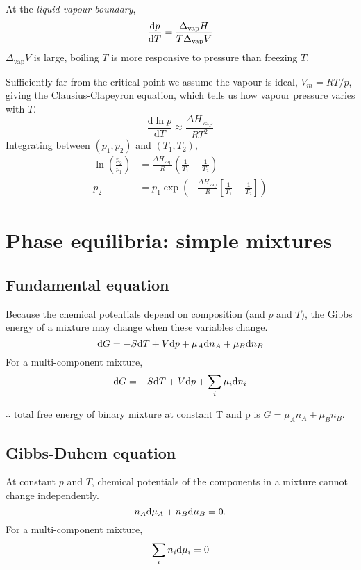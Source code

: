 At the \textit{liquid-vapour boundary},
\begin{equation*}
    \dv{p}{T} = \frac{\Delta_{\textrm{vap}}H}{T\Delta_{\textrm{vap}}V}
\end{equation*}
$\Delta_{\textrm{vap}}V$ is large, boiling $T$ is more responsive to pressure than freezing $T$.

Sufficiently far from the critical point we assume the vapour is ideal, $V_m = RT / p$, giving the Clausius-Clapeyron equation, which tells us how vapour pressure varies with $T$.
\begin{equation*}
    \frac{\mathrm{d}\ln p}{\mathrm{d}T} \approx \frac{\Delta H_{\textrm{vap}}}{RT^2}
\end{equation*}
Integrating between $(p_1, p_2)$ and $(T_1, T_2),$
\begin{equation*}
    \begin{aligned}
        \ln\left(\frac{p_2}{p_1}\right) &= \frac{\Delta H_{\textrm{vap}}}{R}\left(\frac{1}{T_1} - \frac{1}{T_2}\right) \\
        p_2 &= p_1 \exp \left(- \frac{\Delta H_{\textrm{vap}}}{R}\left[\frac{1}{T_1} - \frac{1}{T_2}\right]\right)
    \end{aligned}
\end{equation*}

\section{Phase equilibria: simple mixtures}

\subsection*{Fundamental equation}
Because the chemical potentials depend on composition (and $p$ and $T$), the Gibbs energy of a mixture may change when these variables change.
\begin{equation*}
    \differential G = -S \differential T + V \differential p + \mu_A \differential n_A + \mu_B \differential n_B
\end{equation*}
For a multi-component mixture,
\begin{equation*}
    \differential G = -S \differential T + V \differential p + \sum_i \mu_i \differential n_i
\end{equation*}

$\therefore$ total free energy of binary mixture at constant T and p is $G = \mu_A n_A + \mu_B n_B$.
\subsection*{Gibbs-Duhem equation}
At constant $p$ and $T$, chemical potentials of the components in a mixture cannot change independently.
\begin{equation*}
    n_A \differential \mu_A + n_B \differential \mu_B = 0.
\end{equation*}
For a multi-component mixture,
\begin{equation*}
    \sum_i n_i \differential \mu_i = 0
\end{equation*}

